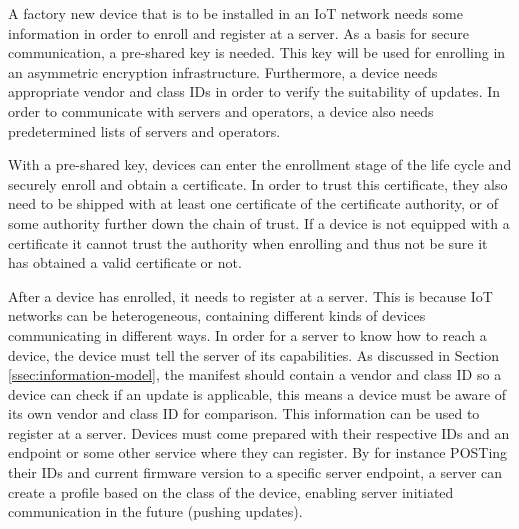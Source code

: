 \documentclass[0-thesis.tex]{subfiles}
\begin{document}
A factory new device that is to be installed in an IoT network needs some information in
order to enroll and register at a server. As a basis for secure communication, a
pre-shared key is needed. This key will be used for enrolling in an asymmetric encryption
infrastructure. Furthermore, a device needs appropriate vendor and class IDs in order to
verify the suitability of updates. In order to communicate with servers and operators, a
device also needs predetermined lists of servers and operators. 

With a pre-shared key, devices can enter the enrollment stage of the life cycle and
securely enroll and obtain a certificate. In order to trust this certificate, they also
need to be shipped with at least one certificate of the certificate authority, or of some
authority further down the chain of trust. If a device is not equipped with a certificate
it cannot trust the authority when enrolling and thus not be sure it has obtained a valid
certificate or not.

After a device has enrolled, it needs to register at a server. This is because IoT
networks can be heterogeneous, containing different kinds of devices communicating in
different ways. In order for a server to know how to reach a device, the device must tell
the server of its capabilities. As discussed in Section \ref{ssec:information-model}, the
manifest should contain a vendor and class ID so a device can check if an update is
applicable, this means a device must be aware of its own vendor and class ID for
comparison. This information can be used to register at a server. Devices must come
prepared with their respective IDs and an endpoint or some other service where they can
register. By for instance POSTing their IDs and current firmware version to a specific
server endpoint, a server can create a profile based on the class of the device, enabling
server initiated communication in the future (pushing updates).
\end{document}
